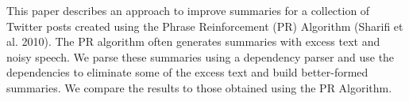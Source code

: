 This paper describes an approach to improve summaries for a collection of Twitter posts created using the Phrase Reinforcement (PR) Algorithm (Sharifi et
 al. 2010).  The PR algorithm often generates summaries with excess text and
 noisy speech.  We parse these  summaries using a dependency parser and use the
 dependencies  to eliminate some of the excess text and build better-formed
 summaries.  We compare the results to those obtained using the PR Algorithm.

